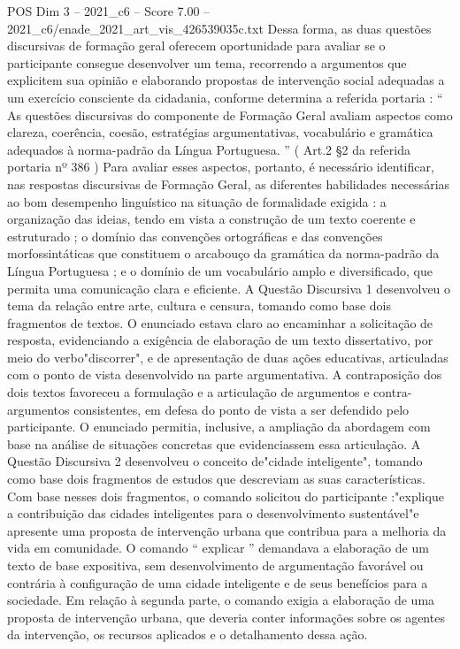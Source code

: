 \begin{textsample}{POS Dim 3 – 2021\_c6 – Score 7.00 – 2021\_c6/enade\_2021\_art\_vis\_426539035c.txt}
Dessa forma, as duas questões discursivas de formação geral oferecem oportunidade para avaliar se o participante consegue desenvolver um tema, recorrendo a argumentos que explicitem sua opinião e elaborando propostas de intervenção social adequadas a um exercício consciente da cidadania, conforme determina a referida portaria : “ As questões discursivas do componente de Formação Geral avaliam aspectos como clareza, coerência, coesão, estratégias argumentativas, vocabulário e gramática adequados à norma-padrão da Língua Portuguesa. ” ( Art.2 §2 da referida portaria nº 386 ) Para avaliar esses aspectos, portanto, é necessário identificar, nas respostas discursivas de Formação Geral, as diferentes habilidades necessárias ao bom desempenho linguístico na situação de formalidade exigida : a organização das ideias, tendo em vista a construção de um texto coerente e estruturado ; o domínio das convenções ortográficas e das convenções morfossintáticas que constituem o arcabouço da gramática da norma-padrão da Língua Portuguesa ; e o domínio de um vocabulário amplo e diversificado, que permita uma comunicação clara e eficiente.
A Questão Discursiva 1 desenvolveu o tema da relação entre arte, cultura e censura, tomando como base dois fragmentos de textos.
O enunciado estava claro ao encaminhar a solicitação de resposta, evidenciando a exigência de elaboração de um texto dissertativo, por meio do verbo"discorrer", e de apresentação de duas ações educativas, articuladas com o ponto de vista desenvolvido na parte argumentativa.
A contraposição dos dois textos favoreceu a formulação e a articulação de argumentos e contra-argumentos consistentes, em defesa do ponto de vista a ser defendido pelo participante.
O enunciado permitia, inclusive, a ampliação da abordagem com base na análise de situações concretas que evidenciassem essa articulação.
A Questão Discursiva 2 desenvolveu o conceito de"cidade inteligente", tomando como base dois fragmentos de estudos que descreviam as suas características.
Com base nesses dois fragmentos, o comando solicitou do participante :"explique a contribuição das cidades inteligentes para o desenvolvimento sustentável"e apresente uma proposta de intervenção urbana que contribua para a melhoria da vida em comunidade.
O comando “ explicar ” demandava a elaboração de um texto de base expositiva, sem desenvolvimento de argumentação favorável ou contrária à configuração de uma cidade inteligente e de seus benefícios para a sociedade.
Em relação à segunda parte, o comando exigia a elaboração de uma proposta de intervenção urbana, que deveria conter informações sobre os agentes da intervenção, os recursos aplicados e o detalhamento dessa ação.

\end{textsample}
